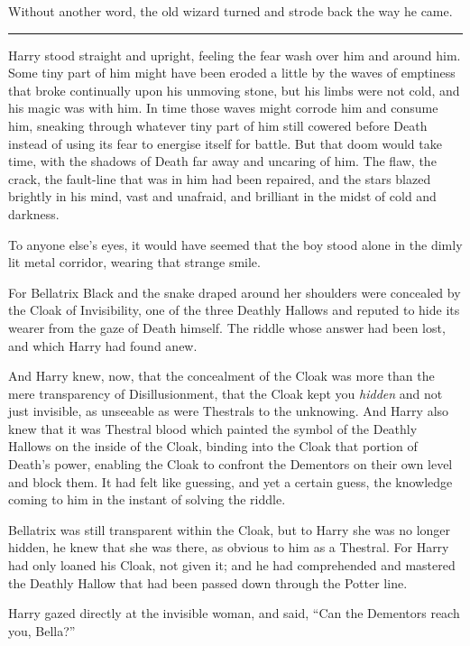 Without another word, the old wizard turned and strode back the way he
came.

\begin{center}\rule{3in}{0.4pt}\end{center}

Harry stood straight and upright, feeling the fear wash over him and
around him. Some tiny part of him might have been eroded a little by the
waves of emptiness that broke continually upon his unmoving stone, but
his limbs were not cold, and his magic was with him. In time those waves
might corrode him and consume him, sneaking through whatever tiny part
of him still cowered before Death instead of using its fear to energise
itself for battle. But that doom would take time, with the shadows of
Death far away and uncaring of him. The flaw, the crack, the fault-line
that was in him had been repaired, and the stars blazed brightly in his
mind, vast and unafraid, and brilliant in the midst of cold and
darkness.

To anyone else's eyes, it would have seemed that the boy stood alone in
the dimly lit metal corridor, wearing that strange smile.

For Bellatrix Black and the snake draped around her shoulders were
concealed by the Cloak of Invisibility, one of the three Deathly Hallows
and reputed to hide its wearer from the gaze of Death himself. The
riddle whose answer had been lost, and which Harry had found anew.

And Harry knew, now, that the concealment of the Cloak was more than the
mere transparency of Disillusionment, that the Cloak kept you
\emph{hidden} and not just invisible, as unseeable as were Thestrals to
the unknowing. And Harry also knew that it was Thestral blood which
painted the symbol of the Deathly Hallows on the inside of the Cloak,
binding into the Cloak that portion of Death's power, enabling the Cloak
to confront the Dementors on their own level and block them. It had felt
like guessing, and yet a certain guess, the knowledge coming to him in
the instant of solving the riddle.

Bellatrix was still transparent within the Cloak, but to Harry she was
no longer hidden, he knew that she was there, as obvious to him as a
Thestral. For Harry had only loaned his Cloak, not given it; and he had
comprehended and mastered the Deathly Hallow that had been passed down
through the Potter line.

Harry gazed directly at the invisible woman, and said, ``Can the
Dementors reach you, Bella?''

